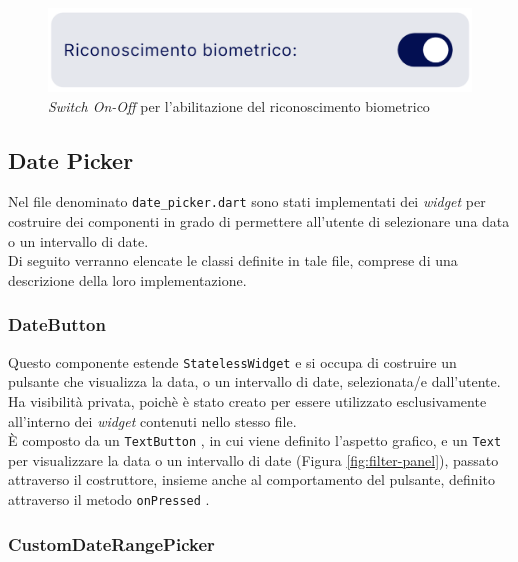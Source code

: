 \begin{figure}[!h] 
    \centering 
    \includegraphics[width=0.4\columnwidth]{images/screenshot/46-biometric_switch.png} 
    \caption{\emph{Switch On-Off} per l'abilitazione del riconoscimento biometrico}
    \label{fig:biometric-switch}
\end{figure}

\subsection{Date Picker}
\label{subsec:date-picker}

Nel file denominato \lstinline{date_picker.dart} sono stati implementati dei \emph{widget} per costruire dei componenti in grado di permettere all'utente di selezionare una data o un intervallo di date.\\
Di seguito verranno elencate le classi definite in tale file, comprese di una descrizione della loro implementazione.

\subsubsection*{DateButton}
\label{subsubsec:date-button}

Questo componente estende \lstinline{StatelessWidget} e si occupa di costruire un pulsante che visualizza la data, o un intervallo di date, selezionata/e dall'utente.\\
Ha visibilità privata, poichè è stato creato per essere utilizzato esclusivamente all'interno dei \emph{widget} contenuti nello stesso file.\\
È composto da un \lstinline{TextButton} \cite{site:text-button}, in cui viene definito l'aspetto grafico, e un \lstinline{Text} per visualizzare la data o un intervallo di date (Figura \ref{fig:filter-panel}), passato attraverso il costruttore, insieme anche al comportamento del pulsante, definito attraverso il metodo \lstinline{onPressed} \cite{site:on-pressed}.

\subsubsection*{CustomDateRangePicker}
\label{subsubsec:custom-date-range-picker}

